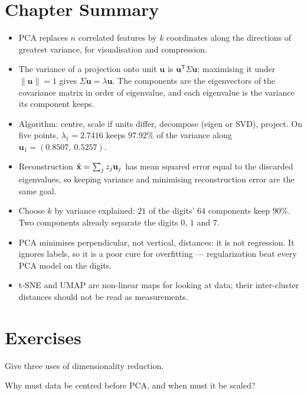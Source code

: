\section*{Chapter Summary}

\begin{itemize}
  \item PCA replaces $n$ correlated features by $k$ coordinates along the
        directions of greatest variance, for visualisation and compression.
  \item The variance of a projection onto unit $\mathbf{u}$ is
        $\mathbf{u}^{\mathsf T}\Sigma\mathbf{u}$; maximising it under
        $\|\mathbf{u}\| = 1$ gives $\Sigma\mathbf{u} = \lambda\mathbf{u}$. The
        components are the eigenvectors of the covariance matrix in order of
        eigenvalue, and each eigenvalue is the variance its component keeps.
  \item Algorithm: centre, scale if units differ, decompose (eigen or SVD),
        project. On five points, $\lambda_1 = 2.7416$ keeps $97.92\%$ of the
        variance along $\mathbf{u}_1 = (0.8507,\ 0.5257)$.
  \item Reconstruction $\hat{\mathbf{x}} = \sum_j z_j\mathbf{u}_j$ has mean squared error
        equal to the discarded eigenvalues, so keeping variance and minimising
        reconstruction error are the same goal.
  \item Choose $k$ by variance explained: $21$ of the digits' $64$ components keep
        $90\%$. Two components already separate the digits $0$, $1$ and $7$.
  \item PCA minimises perpendicular, not vertical, distances: it is not regression.
        It ignores labels, so it is a poor cure for overfitting --- regularization
        beat every PCA model on the digits.
  \item t-SNE and UMAP are non-linear maps for looking at data; their inter-cluster
        distances should not be read as measurements.
\end{itemize}

\section*{Exercises}


\sq Give three uses of dimensionality reduction.

\sq Why must data be centred before PCA, and when must it be scaled?

